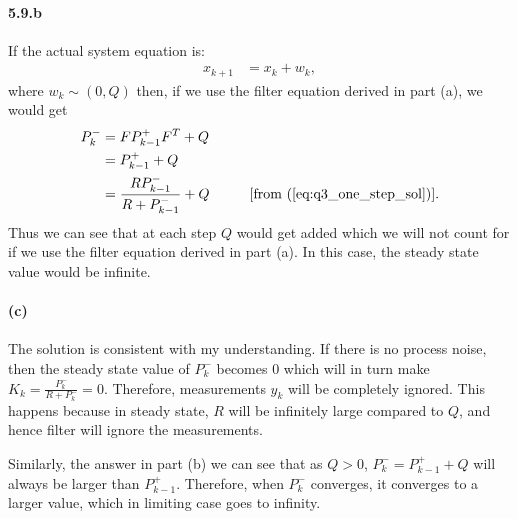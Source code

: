 \paragraph{5.9.b}If the actual system equation is:
\begin{align*}
	x_{k+1} &= x_k + w_k,
\end{align*}
where $w_k \sim (0,Q)$ then, if we use the filter equation derived in part (a), we would get
\begin{align*}
	P_{k}^- &= FP_{k-1}^+F^T+Q\\
	&= P_{k-1}^+ +Q\\
	&= \frac{RP_{k-1}^-}{R+P_{k-1}^-} + Q \hspace*{1cm}[\text{from }(\ref{eq:q3_one_step_sol})].
\end{align*}
Thus we can see that at each step $Q$ would get added which we will not count for if we use the filter equation derived in part (a).
In this case, the steady state value would be infinite.
\paragraph{(c)}The solution is consistent with my understanding. If there is no process noise, then the steady state value of $P_k^-$ becomes $0$ which will in turn make $K_k = \frac{P_k^-}{R+P_k^-} = 0$. Therefore, measurements $y_k$ will be completely ignored. This happens because in steady state, $R$ will be infinitely large compared to $Q$, and hence filter will ignore the measurements.

Similarly, the answer in part (b) we can see that as $Q > 0$, $P_k^- = P_{k-1}^+ + Q$ will always be larger than $P_{k-1}^+$. Therefore, when $P_k^-$ converges, it converges to a larger value, which in limiting case goes to infinity.
